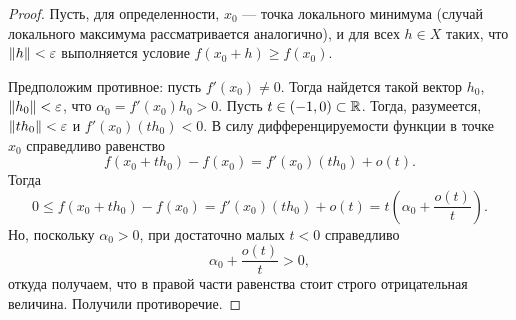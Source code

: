 \begin{proof}
    Пусть, для определенности, $x_0$ --- точка локального минимума (случай локального максимума
    рассматривается аналогично), и для всех $h \in X$ таких, что $\left\|h\right\| < \varepsilon$ 
    выполняется условие $f(x_0 + h) \geq f(x_0)$.

    Предположим противное: пусть $f'(x_0) \neq 0$. Тогда найдется такой вектор $h_0$, 
    $\left\|h_0\right\| < \varepsilon$, что $\alpha_0 = f'(x_0)h_0 > 0$. Пусть 
    $t \in (-1, 0) \subset \mathbb{R}$.
    Тогда, разумеется, $\left\|t h_0\right\| < \varepsilon$ и $f'(x_0)(th_0) < 0$.
    В силу дифференцируемости функции в точке $x_0$ справедливо равенство
    \[ f(x_0 + t h_0) - f(x_0) = f'(x_0)(th_0) + o(t). \]
    Тогда
    \[ 0 \leq f(x_0 + t h_0) - f(x_0) = f'(x_0)(t h_0) + o(t) = t \left( \alpha_0 +
         \frac{o(t)}{t} \right). \]
    Но, поскольку $\alpha_0 > 0$, при достаточно малых $t < 0$ справедливо
    \[ \alpha_0 + \frac{o(t)}{t} > 0, \]
    откуда получаем, что в правой части равенства стоит строго отрицательная величина. 
    Получили противоречие.
\end{proof}
